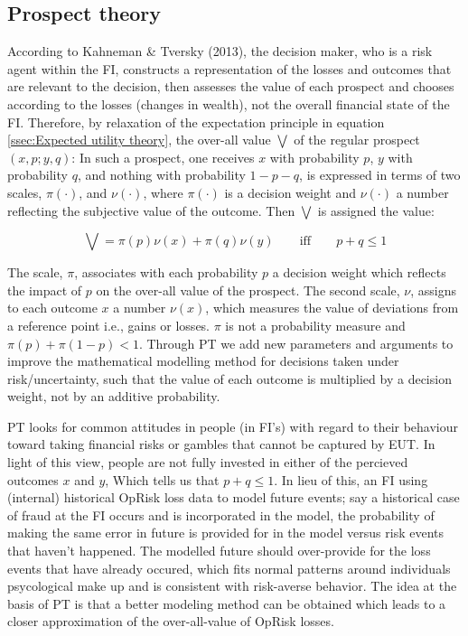 \documentclass{DissertateUSU}
\begin{document}
\subsection{Prospect theory}
\label{ssec:Prospect theory}

According to Kahneman \& Tversky (2013), the decision maker, who is a
risk agent within the FI, constructs a representation of the losses and
outcomes that are relevant to the decision, then assesses the value of
each prospect and chooses according to the losses (changes in wealth),
not the overall financial state of the FI. Therefore, by relaxation of
the expectation principle in equation
\ref{ssec:Expected utility theory}, the over-all value
\(\mathbf{\bigvee}\) of the regular prospect \((x,p;y,q)\): In such a
prospect, one receives \(x\) with probability \(p\), \(y\) with
probability \(q\), and nothing with probability \(1-p-q\), is expressed
in terms of two scales, \(\pi(\cdot)\), and \(\nu(\cdot)\), where
\(\pi(\cdot)\) is a decision weight and \(\nu(\cdot)\) a number
reflecting the subjective value of the outcome. Then
\(\mathbf{\bigvee}\) is assigned the value:

\begin{equation}\label{eqn2}
\mathbf{\bigvee}=\pi(p)\nu(x)+\pi(q)\nu(y) \qquad\mbox{iff} \qquad p+q \leq 1
\end{equation}

The scale, \(\pi\), associates with each probability \(p\) a decision
weight which reflects the impact of \(p\) on the over-all value of the
prospect. The second scale, \(\nu\), assigns to each outcome \(x\) a
number \(\nu(x)\), which measures the value of deviations from a
reference point i.e., gains or losses. \(\pi\) is not a probability
measure and \(\pi(p) + \pi(1-p) < 1\). Through PT we add new parameters
and arguments to improve the mathematical modelling method for decisions
taken under risk/uncertainty, such that the value of each outcome is
multiplied by a decision weight, not by an additive probability.\medskip

PT looks for common attitudes in people (in FI's) with regard to their
behaviour toward taking financial risks or gambles that cannot be
captured by EUT. In light of this view, people are not fully invested in
either of the percieved outcomes \(x\) and \(y\), Which tells us that
\(p+q \leq 1\). In lieu of this, an FI using (internal) historical
OpRisk loss data to model future events; say a historical case of fraud
at the FI occurs and is incorporated in the model, the probability of
making the same error in future is provided for in the model versus risk
events that haven't happened. The modelled future should over-provide
for the loss events that have already occured, which fits normal
patterns around individuals psycological make up and is consistent with
risk-averse behavior. The idea at the basis of PT is that a better
modeling method can be obtained which leads to a closer approximation of
the over-all-value of OpRisk losses.
\end{document}
